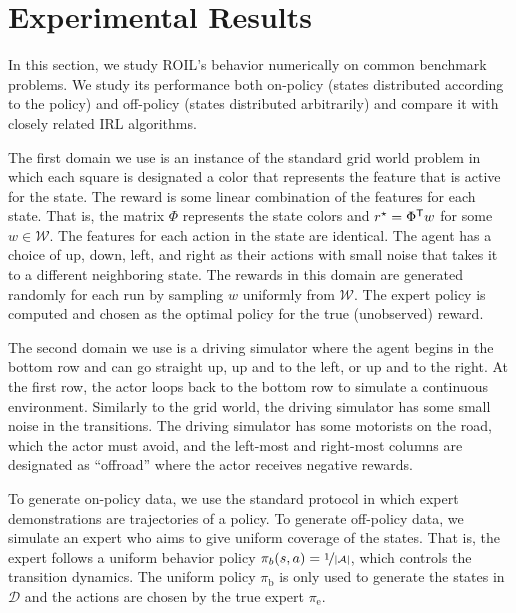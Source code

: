\documentclass[10pt]{article}
\renewcommand{\cite}{\citep}
\theoremstyle{plain}
\theoremstyle{remark}
\begin{document}

\section{Experimental Results}
\label{sec:experimental-results}


In this section, we study ROIL's behavior numerically on common benchmark problems. We study its performance both on-policy (states distributed according to the policy) and off-policy (states distributed arbitrarily) and compare it with closely related IRL algorithms.

The first domain we use is an instance of the standard grid world problem \cite{abbeel2004} in which each square is designated a color that represents the feature that is active for the state. The reward is some linear combination of the features for each state. That is, the matrix $\Phi$ represents the state colors and  $r^{\mathnormal{\star}}  = \Phi^{\mathsf{T}} w$ for some $w \in \mathcal{W}$. The features for each action in the state are identical. The agent has a choice of up, down, left, and right as their actions with small noise that takes it to a different neighboring state. The rewards in this domain are generated randomly for each run by sampling $w$ uniformly from $\mathcal{W}$. The expert policy is computed and chosen as the optimal policy for the true (unobserved) reward.

The second domain we use is a driving simulator where the agent begins in the bottom row and can go straight up, up and to the left, or up and to the right. At the first row, the actor loops back to the bottom row to simulate a continuous environment. Similarly to the grid world, the driving simulator has some small noise in the transitions. The driving simulator has some motorists on the road, which the actor must avoid, and the left-most and right-most columns are designated as ``offroad'' where the actor receives negative rewards.

To generate on-policy data, we use the standard protocol in which expert demonstrations are trajectories of a policy. To generate off-policy data, we simulate an expert who aims to give uniform coverage of the states. That is, the expert follows a uniform behavior policy  $\pi_b(s,a) = \nicefrac{1}{\lvert \mathcal{A} \rvert}$, which controls the transition dynamics. The uniform policy $\pi_{\mathrm{b}}$ is only used to generate the states in $\mathcal{D}$ and the actions are chosen by the true expert $\pi_{\mathrm{e}}$.
\end{document}
